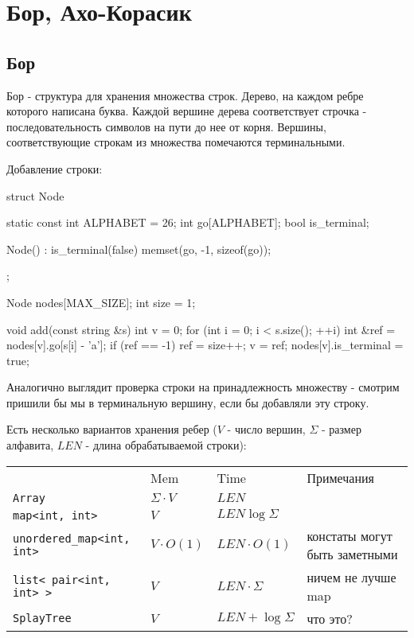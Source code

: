 
\section{Бор, Ахо-Корасик}

\subsection{Бор}

Бор - структура для хранения множества строк. Дерево, на каждом ребре которого написана буква. Каждой вершине дерева соответствует строчка - последовательность символов на пути до нее от корня. Вершины, соответствующие строкам из множества помечаются терминальными. 

Добавление строки:

\begin{cppcode}
struct Node {
    static const int ALPHABET = 26;
    int go[ALPHABET];
    bool is_terminal;
    
    Node() : is_terminal(false) {
        memset(go, -1, sizeof(go));
    }
};

Node nodes[MAX_SIZE];
int size = 1;

void add(const string &s) {
    int v = 0;
    for (int i = 0; i < s.size(); ++i) {
        int &ref = nodes[v].go[s[i] - 'a'];
        if (ref == -1)
            ref = size++;
        v = ref; 	
    }
    nodes[v].is_terminal = true;
}
\end{cppcode}

Аналогично выглядит проверка строки на принадлежность множеству - смотрим пришили бы мы в терминальную вершину, если бы добавляли эту строку.

Есть несколько вариантов хранения ребер ($V$ - число вершин, $\Sigma$ - размер алфавита, $LEN$ - длина обрабатываемой строки):

\begin{tabular}[c]{llll}
& Mem & Time & Примечания \\
\texttt{Array} & $\Sigma \cdot V$ & $LEN$ &  \\
\texttt{map<int, int>} & $V$ & $LEN \log \Sigma$ & \\
\texttt{unordered\_map<int, int>} & $V \cdot O(1)$ & $LEN \cdot O(1)$ & констаты могут быть заметными \\
\texttt{list< pair<int, int> >} & $V$ & $LEN \cdot \Sigma$ & ничем не лучше map \\
\texttt{SplayTree} & $V$ & $LEN + \log \Sigma$ & что это?\\
\end{tabular}

